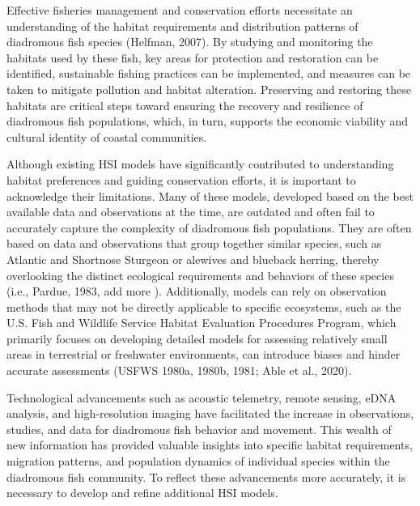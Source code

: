 \documentclass[
]{book}
\begin{document}
Effective fisheries management and conservation efforts necessitate an understanding of the habitat requirements and distribution patterns of diadromous fish species (Helfman, 2007). By studying and monitoring the habitats used by these fish, key areas for protection and restoration can be identified, sustainable fishing practices can be implemented, and measures can be taken to mitigate pollution and habitat alteration. Preserving and restoring these habitats are critical steps toward ensuring the recovery and resilience of diadromous fish populations, which, in turn, supports the economic viability and cultural identity of coastal communities.

Although existing HSI models have significantly contributed to understanding habitat preferences and guiding conservation efforts, it is important to acknowledge their limitations. Many of these models, developed based on the best available data and observations at the time, are outdated and often fail to accurately capture the complexity of diadromous fish populations. They are often based on data and observations that group together similar species, such as Atlantic and Shortnose Sturgeon or alewives and blueback herring, thereby overlooking the distinct ecological requirements and behaviors of these species (i.e., Pardue, 1983, add more ). Additionally, models can rely on observation methods that may not be directly applicable to specific ecosystems, such as the U.S. Fish and Wildlife Service Habitat Evaluation Procedures Program, which primarily focuses on developing detailed models for assessing relatively small areas in terrestrial or freshwater environments, can introduce biases and hinder accurate assessments (USFWS 1980a, 1980b, 1981; Able et al., 2020).

Technological advancements such as acoustic telemetry, remote sensing, eDNA analysis, and high-resolution imaging have facilitated the increase in observations, studies, and data for diadromous fish behavior and movement. This wealth of new information has provided valuable insights into specific habitat requirements, migration patterns, and population dynamics of individual species within the diadromous fish community. To reflect these advancements more accurately, it is necessary to develop and refine additional HSI models.
\end{document}
